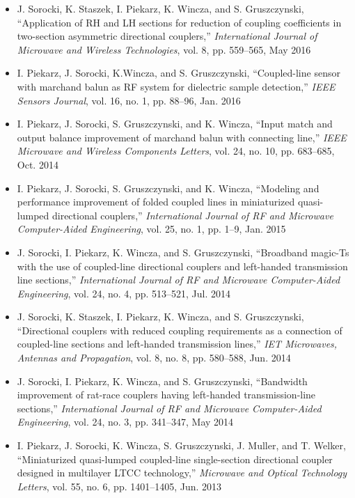 \begin{itemize}[nosep]
\item J. Sorocki, K. Staszek, I. Piekarz, K. Wincza, and S. Gruszczynski, “Application of RH and LH sections for reduction of coupling coefficients in two-section asymmetric directional couplers,” \textit{International Journal of Microwave and Wireless Technologies}, vol. 8, pp. 559–565, May 2016
\item I. Piekarz, J. Sorocki, K.Wincza, and S. Gruszczynski, “Coupled-line sensor with marchand balun as RF system for dielectric sample detection,” \textit{IEEE Sensors Journal}, vol. 16, no. 1, pp. 88–96, Jan. 2016
\item I. Piekarz, J. Sorocki, S. Gruszczynski, and K. Wincza, “Input match and output balance
improvement of marchand balun with connecting line,” \textit{IEEE Microwave and Wireless
Components Letters}, vol. 24, no. 10, pp. 683–685, Oct. 2014
\item I. Piekarz, J. Sorocki, S. Gruszczynski, and K. Wincza, “Modeling and performance improvement of folded coupled lines in miniaturized quasi-lumped directional couplers,” \textit{International Journal of RF and Microwave Computer-Aided Engineering}, vol. 25, no. 1, pp. 1–9, Jan. 2015
\item J. Sorocki, I. Piekarz, K. Wincza, and S. Gruszczynski, “Broadband magic-Ts with the use
of coupled-line directional couplers and left-handed transmission line sections,” \textit{International Journal of RF and Microwave Computer-Aided Engineering}, vol. 24, no. 4, pp. 513–521, Jul. 2014
\item J. Sorocki, K. Staszek, I. Piekarz, K. Wincza, and S. Gruszczynski, “Directional couplers
with reduced coupling requirements as a connection of coupled-line sections and left-handed
transmission lines,” \textit{IET Microwaves, Antennas and Propagation}, vol. 8, no. 8, pp. 580–588, Jun. 2014
\item J. Sorocki, I. Piekarz, K. Wincza, and S. Gruszczynski, “Bandwidth improvement of rat-race
couplers having left-handed transmission-line sections,” \textit{International Journal of RF and
Microwave Computer-Aided Engineering}, vol. 24, no. 3, pp. 341–347, May 2014
\item I. Piekarz, J. Sorocki, K. Wincza, S. Gruszczynski, J. Muller, and T. Welker, “Miniaturized
quasi-lumped coupled-line single-section directional coupler designed in multilayer LTCC
technology,” \textit{Microwave and Optical Technology Letters}, vol. 55, no. 6, pp. 1401–1405, Jun. 2013
\end{itemize}
\vspace*{1cm} %

